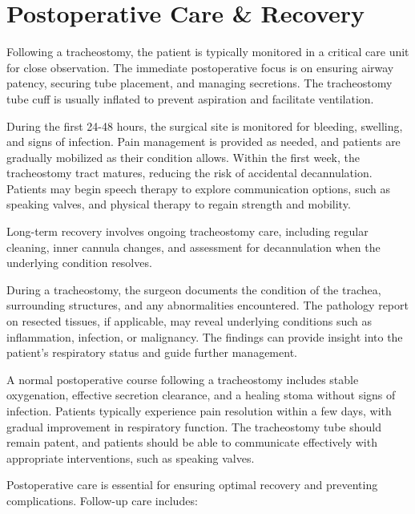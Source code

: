 \section*{Postoperative Care \& Recovery}
Following a tracheostomy, the patient is typically monitored in a critical care unit for close observation. The immediate postoperative focus is on ensuring airway patency, securing tube placement, and managing secretions. The tracheostomy tube cuff is usually inflated to prevent aspiration and facilitate ventilation. 

During the first 24-48 hours, the surgical site is monitored for bleeding, swelling, and signs of infection. Pain management is provided as needed, and patients are gradually mobilized as their condition allows. Within the first week, the tracheostomy tract matures, reducing the risk of accidental decannulation. Patients may begin speech therapy to explore communication options, such as speaking valves, and physical therapy to regain strength and mobility.

Long-term recovery involves ongoing tracheostomy care, including regular cleaning, inner cannula changes, and assessment for decannulation when the underlying condition resolves.

During a tracheostomy, the surgeon documents the condition of the trachea, surrounding structures, and any abnormalities encountered. The pathology report on resected tissues, if applicable, may reveal underlying conditions such as inflammation, infection, or malignancy. The findings can provide insight into the patient's respiratory status and guide further management.

A normal postoperative course following a tracheostomy includes stable oxygenation, effective secretion clearance, and a healing stoma without signs of infection. Patients typically experience pain resolution within a few days, with gradual improvement in respiratory function. The tracheostomy tube should remain patent, and patients should be able to communicate effectively with appropriate interventions, such as speaking valves.

Postoperative care is essential for ensuring optimal recovery and preventing complications. Follow-up care includes:


